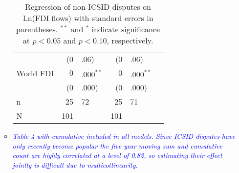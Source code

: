 \begin{enumerate}
\begin{itemize}
\begin{table}[ht]
\begin{tabular}{lr@{} lr@{}lr@{}}
			   & (0&.06) & (0&.06) \\ 
			  World FDI & $0$&$.000^{\ast\ast}$ & $0$&$.000^{\ast\ast}$ \\ 
			   & (0&.000) & (0&.000) \\    
			   \hline
			n & 25&72 & 25&71 \\ 
			  N & 101 && 101 \\ 
			   \hline
			\hline
			\end{tabular}
			\endgroup
			\caption{Regression of non-ICSID disputes on Ln(FDI flows) with standard errors in parentheses. $^{**}$ and $^{*}$ indicate significance at $p< 0.05 $ and $p< 0.10 $, respectively.} 
			\end{table}			
			\FloatBarrier

		\clearpage
		\item \textcolor{blue}{ \emph{ Table 4 with cumulative included in all models. Since ICSID disputes have only recently become popular the five year moving sum and cumulative count are highly correlated at a level of 0.82, so estimating their effect jointly is difficult due to multicollinearity.}}


\end{itemize}
\end{enumerate}
